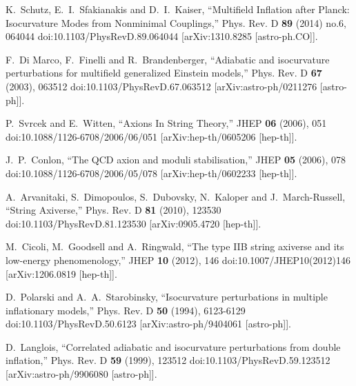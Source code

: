 \documentclass[a4paper,11pt]{article}
\begin{document}
\begin{thebibliography}{10}
K.~Schutz, E.~I.~Sfakianakis and D.~I.~Kaiser,
``Multifield Inflation after Planck: Isocurvature Modes from Nonminimal Couplings,''
Phys. Rev. D \textbf{89} (2014) no.6, 064044
doi:10.1103/PhysRevD.89.064044
[arXiv:1310.8285 [astro-ph.CO]].

F.~Di Marco, F.~Finelli and R.~Brandenberger,
``Adiabatic and isocurvature perturbations for multifield generalized Einstein models,''
Phys. Rev. D \textbf{67} (2003), 063512
doi:10.1103/PhysRevD.67.063512
[arXiv:astro-ph/0211276 [astro-ph]].

P.~Svrcek and E.~Witten,
``Axions In String Theory,''
JHEP \textbf{06} (2006), 051
doi:10.1088/1126-6708/2006/06/051
[arXiv:hep-th/0605206 [hep-th]].

J.~P.~Conlon,
``The QCD axion and moduli stabilisation,''
JHEP \textbf{05} (2006), 078
doi:10.1088/1126-6708/2006/05/078
[arXiv:hep-th/0602233 [hep-th]].

A.~Arvanitaki, S.~Dimopoulos, S.~Dubovsky, N.~Kaloper and J.~March-Russell,
``String Axiverse,''
Phys. Rev. D \textbf{81} (2010), 123530
doi:10.1103/PhysRevD.81.123530
[arXiv:0905.4720 [hep-th]].

M.~Cicoli, M.~Goodsell and A.~Ringwald,
``The type IIB string axiverse and its low-energy phenomenology,''
JHEP \textbf{10} (2012), 146
doi:10.1007/JHEP10(2012)146
[arXiv:1206.0819 [hep-th]].

D.~Polarski and A.~A.~Starobinsky,
``Isocurvature perturbations in multiple inflationary models,''
Phys. Rev. D \textbf{50} (1994), 6123-6129
doi:10.1103/PhysRevD.50.6123
[arXiv:astro-ph/9404061 [astro-ph]].

D.~Langlois,
``Correlated adiabatic and isocurvature perturbations from double inflation,''
Phys. Rev. D \textbf{59} (1999), 123512
doi:10.1103/PhysRevD.59.123512
[arXiv:astro-ph/9906080 [astro-ph]].


\end{thebibliography}
\end{document}
